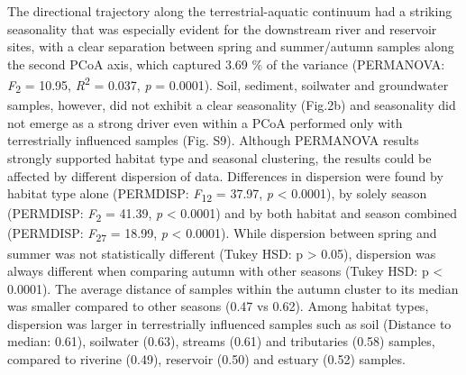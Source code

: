 \documentclass[12pt,a4paper]{article} %
\begin{document}
The directional trajectory along the terrestrial-aquatic continuum had a striking seasonality that was especially evident for the downstream river and reservoir sites, with a clear separation between spring and summer/autumn samples along the second PCoA axis, which captured 3.69 \% of the variance (PERMANOVA: \textit{F}\textsubscript{2} = 10.95, \textit{R}\textsuperscript{2} = 0.037, \textit{p} = 0.0001). Soil, sediment, soilwater and groundwater samples, however, did not exhibit a clear seasonality (Fig.2b) and seasonality did not emerge as a strong driver even within a PCoA performed only with terrestrially influenced samples (Fig. S9). Although PERMANOVA results strongly supported habitat type and seasonal clustering, the results could be affected by different dispersion of data. Differences in dispersion were found by habitat type alone (PERMDISP: \textit{F}\textsubscript{12} = 37.97, \textit{p} < 0.0001), by solely season (PERMDISP: \textit{F}\textsubscript{2} = 41.39, \textit{p} < 0.0001) and by both habitat and season combined (PERMDISP: \textit{F}\textsubscript{27} = 18.99, \textit{p} < 0.0001). While dispersion between spring and summer was not statistically different (Tukey HSD: p > 0.05), dispersion was always different when comparing autumn with other seasons (Tukey HSD: p < 0.0001). The average distance of samples within the autumn cluster to its median was smaller compared to other seasons (0.47 vs 0.62). Among habitat types, dispersion was larger in terrestrially influenced samples such as soil (Distance to median: 0.61), soilwater (0.63), streams (0.61) and tributaries (0.58) samples, compared to riverine (0.49), reservoir (0.50) and estuary (0.52) samples.
\end{document}

